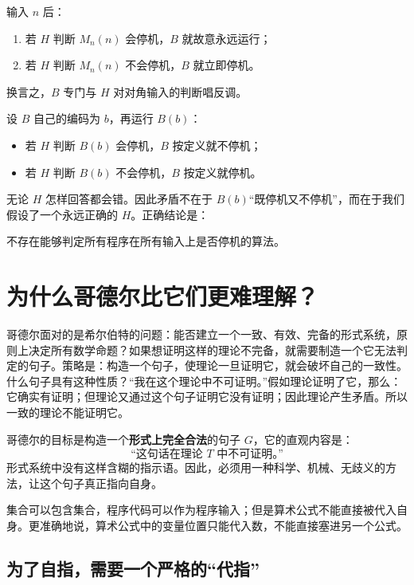 \documentclass[11pt,a4paper]{article}
\begin{document}
\begin{plainbox}[反转机器 $B$]
输入 $n$ 后：
\begin{enumerate}
  \item 若 $H$ 判断 $M_n(n)$ 会停机，$B$ 就故意永远运行；
  \item 若 $H$ 判断 $M_n(n)$ 不会停机，$B$ 就立即停机。
\end{enumerate}
换言之，$B$ 专门与 $H$ 对对角输入的判断唱反调。
\end{plainbox}

设 $B$ 自己的编码为 $b$，再运行 $B(b)$：

\begin{itemize}
  \item 若 $H$ 判断 $B(b)$ 会停机，$B$ 按定义就不停机；
  \item 若 $H$ 判断 $B(b)$ 不会停机，$B$ 按定义就停机。
\end{itemize}

无论 $H$ 怎样回答都会错。因此矛盾不在于 $B(b)$“既停机又不停机”，而在于我们假设了一个永远正确的 $H$。正确结论是：

\begin{keybox}[图灵的边界]
\centering
不存在能够判定所有程序在所有输入上是否停机的算法。
\end{keybox}

\section{为什么哥德尔比它们更难理解？}

哥德尔面对的是希尔伯特的问题：能否建立一个一致、有效、完备的形式系统，原则上决定所有数学命题？如果想证明这样的理论不完备，就需要制造一个它无法判定的句子。策略是：构造一个句子，使理论一旦证明它，就会破坏自己的一致性。什么句子具有这种性质？“我在这个理论中不可证明。”假如理论证明了它，那么：它确实有证明；但理论又通过这个句子证明它没有证明；因此理论产生矛盾。所以一致的理论不能证明它。


哥德尔的目标是构造一个\textbf{形式上完全合法}的句子 $G$，它的直观内容是：
\[
 \text{“这句话在理论 $T$ 中不可证明。”}
\]
形式系统中没有这样含糊的指示语。因此，必须用一种科学、机械、无歧义的方法，让这个句子真正指向自身。

\begin{plainbox}
集合可以包含集合，程序代码可以作为程序输入；但是算术公式不能直接被代入自身。更准确地说，算术公式中的变量位置只能代入数，不能直接塞进另一个公式。
\end{plainbox}

\subsection{为了自指，需要一个严格的“代指”}
\end{document}
